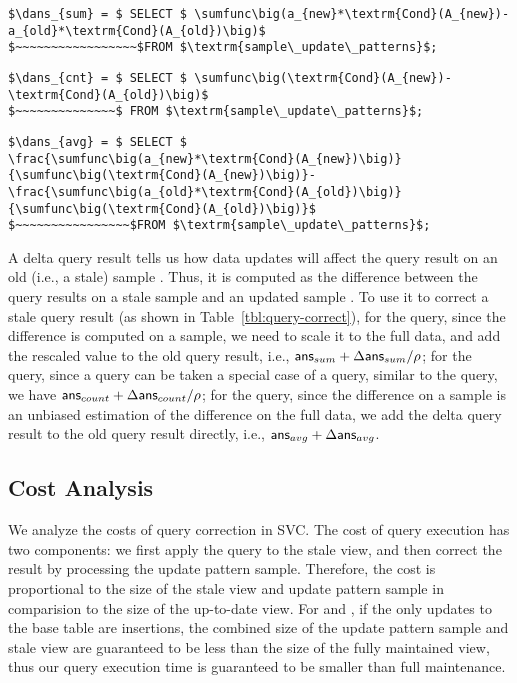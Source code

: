 \fussy

\begin{lstlisting}[mathescape,basicstyle={\scriptsize}]
$\dans_{sum} = $ SELECT $ \sumfunc\big(a_{new}*\textrm{Cond}(A_{new})-a_{old}*\textrm{Cond}(A_{old})\big)$ 
$~~~~~~~~~~~~~~~~~$FROM $\textrm{sample\_update\_patterns}$;
\end{lstlisting}

\begin{lstlisting}[mathescape,basicstyle={\scriptsize}]
$\dans_{cnt} = $ SELECT $ \sumfunc\big(\textrm{Cond}(A_{new})-\textrm{Cond}(A_{old})\big)$ 
$~~~~~~~~~~~~~~$ FROM $\textrm{sample\_update\_patterns}$;
\end{lstlisting}


\begin{lstlisting}[mathescape,basicstyle={\scriptsize}]
$\dans_{avg} = $ SELECT $
\frac{\sumfunc\big(a_{new}*\textrm{Cond}(A_{new})\big)}{\sumfunc\big(\textrm{Cond}(A_{new})\big)}- \frac{\sumfunc\big(a_{old}*\textrm{Cond}(A_{old})\big)}{\sumfunc\big(\textrm{Cond}(A_{old})\big)}$ 
$~~~~~~~~~~~~~~~~$FROM $\textrm{sample\_update\_patterns}$;
\end{lstlisting}

A delta query result tells us how data updates will affect the query result on an old (i.e., a stale) sample \aggview. Thus, it is computed as the difference between the query results on a stale sample \aggview and an updated sample \aggview. To use it to correct a stale query result (as shown in Table~\ref{tbl:query-correct}), for the \sumfunc query, since the \sumfunc difference is computed on a sample, we need to scale it to the full data, and add the rescaled value to the old query result, i.e., $\textsf{ans}_{sum}+\Delta\textsf{ans}_{sum}/\rho $; for the \countfunc query, since a \countfunc query can be taken a special case of a \sumfunc query, similar to the \sumfunc query, we have $\textsf{ans}_{count}+\Delta\textsf{ans}_{count}/\rho $; for the \avgfunc query, since the \avgfunc difference on a sample is an unbiased estimation of the \avgfunc difference on the full data, we add the delta query result to the old query result directly, i.e., $\textsf{ans}_{avg}+\Delta\textsf{ans}_{avg}$.


\subsection{Cost Analysis}\label{subsec-corr-cost}
We analyze the costs of query correction in SVC.
The cost of query execution has two components: we first apply the query to the stale view, and then correct the result by processing the update pattern sample.
Therefore, the cost is proportional to the size of the stale view and update pattern sample in comparision to the size of the up-to-date view.
For \fjview and \spview, if the only updates to the base table are insertions, the combined size of the update pattern sample and stale view are guaranteed to be less than the size of the fully maintained view, thus our query execution time is guaranteed to be smaller than full maintenance.

